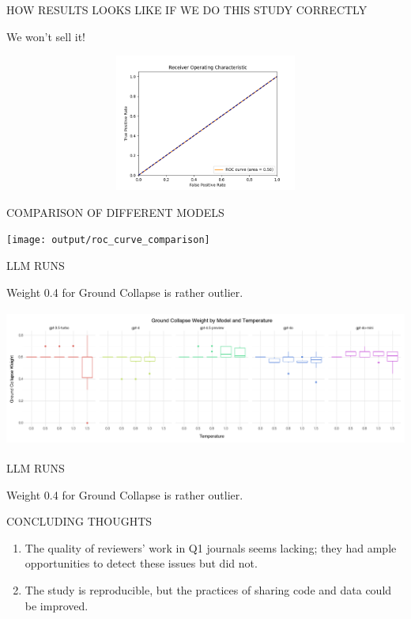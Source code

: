 \documentclass[11pt, aspectratio=169]{beamer}
\begin{document}
\begin{frame}{\MakeUppercase{How results looks like if we do this study correctly}}

    We won't sell it!

    \includegraphics[width=14cm,height=4.5cm]{output/alternative_roc_curve}

\end{frame}


\begin{frame}{\MakeUppercase{Comparison of different models}}

    \texttt{[image: output/roc\_curve\_comparison]}

\end{frame}


\begin{frame}{\MakeUppercase{LLM runs}}

    Weight 0.4 for Ground Collapse is rather outlier.

    \includegraphics[width=14cm,height=4.5cm]{output/llm_ground_collapse_plot}

\end{frame}

\begin{frame}{\MakeUppercase{LLM runs}}

    Weight 0.4 for Ground Collapse is rather outlier.

    

\end{frame}


\begin{frame}{\MakeUppercase{Concluding Thoughts}}

    \begin{enumerate}
        \item The quality of reviewers' work in Q1 journals seems lacking; they had ample opportunities to detect these issues but did not.
        \item The study is reproducible, but the practices of sharing code and data could be improved.
    \end{enumerate}

\end{frame}
\end{document}
